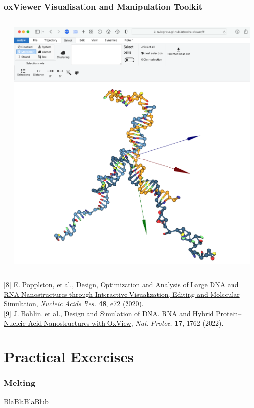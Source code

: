\documentclass[slidestop,compress,9pt]{beamer}
\begin{document}
\begin{frame}
\end{frame}

\begin{frame}
\frametitle{oxViewer Visualisation and Manipulation Toolkit}
\small
\begin{columns}
\begin{column}{0.5\textwidth}
\end{column}
\begin{column}{0.5\textwidth}
\begin{center}
\vspace*{-0.25cm}
\includegraphics[width=\textwidth]{oxviewer.png}
\end{center}
\end{column}
\end{columns}

[8] E. Poppleton, et al., \href{https://doi.org/10.1093/nar/gkaa417}{Design, Optimization and Analysis of Large DNA and RNA Nanostructures through Interactive Visualization, Editing and Molecular Simulation}, \textit{Nucleic Acids Res.} \textbf{48}, e72 (2020).\\[3pt]

[9] J. Bohlin, et al., \href{https://doi.org/10.1038/s41596-022-00688-5}{Design and Simulation of DNA, RNA and Hybrid Protein–Nucleic Acid Nanostructures with OxView}, \textit{Nat. Protoc.} \textbf{17}, 1762 (2022).


\end{frame}

\section{Practical Exercises}

\begin{frame}
\frametitle{Melting}
BlaBlaBlaBlub

\end{frame}
\end{document}
